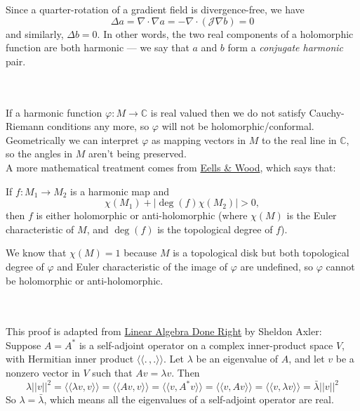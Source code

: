 \documentclass{article}
\def\grad{\nabla}
\def\lap{\Delta}
\def\cJ{\mathcal{J}}
\def\C{\mathbb{C}}
\def\ll{\langle\langle}
\def\rr{\rangle\rangle}
\begin{document}
Since a quarter-rotation of a gradient field is divergence-free, we have
$$\lap a = \grad \cdot \grad a = -\grad \cdot (\cJ \grad b) = 0$$
and similarly, $\lap b = 0$. In other words, the two real components of a holomorphic function
are both harmonic — we say that $a$ and $b$ form a \emph{conjugate harmonic} pair.


\vspace{1.8cm}
\\\\


If a harmonic function $\varphi : M \rightarrow \C$ is real valued then we do not satisfy Cauchy-Riemann conditions any more,
so $\varphi$ will not be holomorphic/conformal.\\
Geometrically we can interpret $\varphi$ as mapping vectors in $M$ to the real line in $\C$, so the angles in $M$ 
aren't being preserved. \\

A more mathematical treatment comes from \href{https://doi.org/10.1016/0040-9383(76)90042-2}{Eells \& Wood}, which says that:
\begin{mdframed}
    If $f : M_1 \rightarrow M_2$ is a harmonic map and 
    $$\chi(M_1) + |\deg(f)\chi(M_2)| > 0,$$
    then $f$ is either holomorphic or anti-holomorphic (where $\chi(M)$ is the Euler characteristic of $M$, and $\deg(f)$
    is the topological degree of $f$).
\end{mdframed}
We know that $\chi(M) = 1$ because $M$ is a topological disk but both topological degree of $\varphi$ and Euler characteristic 
of the image of $\varphi$ are undefined, so $\varphi$ cannot be holomorphic or anti-holomorphic.


\vspace{1.8cm}
\\\\


This proof is adapted from \href{https://linear.axler.net/}{Linear Algebra Done Right} by Sheldon Axler:\\

Suppose $A = A^*$ is a self-adjoint operator on a complex inner-product space $V$, with Hermitian inner product $\ll.\,,.\rr$.
Let $\lambda$ be an eigenvalue of $A$, and let $v$ be a nonzero vector in $V$ such that $Av=\lambda v$. Then
$$
    \lambda||v||^2 = \ll\lambda v, v \rr = \ll A v, v \rr = \ll v, A^* v \rr = \ll v, Av \rr = \ll v, \lambda v \rr = \bar{\lambda}||v||^2
$$
So $\lambda = \bar{\lambda}$, which means all the eigenvalues of a self-adjoint operator are real.
\end{document}
